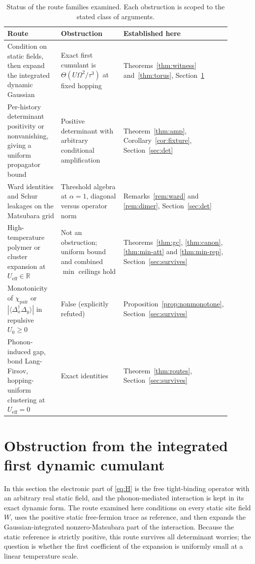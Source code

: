 \documentclass[11pt]{article}
\theoremstyle{definition}
\theoremstyle{remark}
\newcommand{\R}{\mathbb{R}}
\newcommand{\eff}{\mathrm{eff}}
\newcommand{\pair}{\mathrm{pair}}
\newcommand{\Ueff}{U_{\eff}}
\begin{document}
\begin{table}[htbp]
\centering
\small
\begin{tabular}{@{}>{\raggedright\arraybackslash}p{0.24\linewidth}>{\raggedright\arraybackslash}p{0.29\linewidth}>{\raggedright\arraybackslash}p{0.37\linewidth}@{}}
\hline
Route & Obstruction & Established here \\
\hline
Condition on static fields, then expand the integrated dynamic Gaussian &
Exact first cumulant is $\Theta(U\Omega^2/\tau^3)$ at fixed hopping &
Theorems~\ref{thm:witness} and~\ref{thm:torus}, Section~\ref{sec:cumulant} \\
\hline
Per-history determinant positivity or nonvanishing, giving a uniform propagator
bound & Positive determinant with arbitrary conditional amplification &
Theorem~\ref{thm:amp}, Corollary~\ref{cor:fixture}, Section~\ref{sec:det} \\
\hline
Ward identities and Schur leakages on the Matsubara grid & Threshold algebra at
$\alpha=1$, diagonal versus operator norm & Remarks~\ref{rem:ward} and
\ref{rem:dimer}, Section~\ref{sec:det} \\
\hline
High-temperature polymer or cluster expansion at $\Ueff\in\R$ & Not an obstruction;
uniform bound and combined $\min$ ceilings hold & Theorems~\ref{thm:gc},
\ref{thm:canon}, \ref{thm:min-att} and \ref{thm:min-rep},
Section~\ref{sec:survives} \\
\hline
Monotonicity of $\chi_{\pair}$ or $|\langle\Delta_x^\dagger\Delta_y\rangle|$ in
repulsive $U_0\ge0$ & False (explicitly refuted) & Proposition~\ref{prop:nonmonotone},
Section~\ref{sec:survives} \\
\hline
Phonon-induced gap, bond Lang-Firsov, hopping-uniform clustering at $\Ueff=0$ &
Exact identities & Theorem~\ref{thm:routes}, Section~\ref{sec:survives} \\
\hline
\end{tabular}
\caption{Status of the route families examined. Each obstruction is scoped to the
stated class of arguments.}
\label{tab:routes}
\end{table}

\section{Obstruction from the integrated first dynamic cumulant}
\label{sec:cumulant}

In this section the electronic part of \eqref{eq:H} is the free tight-binding
operator with an arbitrary real static field, and the phonon-mediated interaction is
kept in its exact dynamic form. The route examined here conditions on every static
site field $W$, uses the positive static free-fermion trace as reference, and then
expands the Gaussian-integrated nonzero-Matsubara part of the interaction. Because
the static reference is strictly positive, this route survives all determinant
worries; the question is whether the first coefficient of the expansion is
uniformly small at a linear temperature scale.
\end{document}
